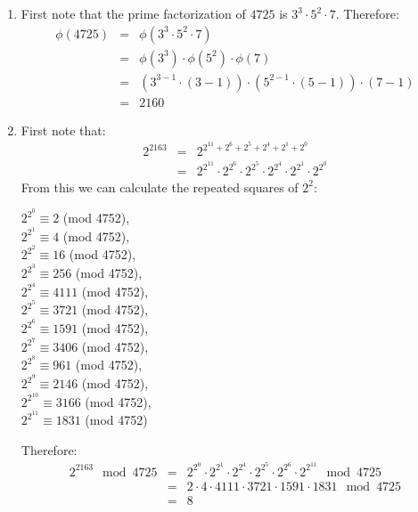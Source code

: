 \begin{enumerate}

    \item First note that the prime factorization of $4725$ is $3^{3} \cdot 5^{2} \cdot 7$.
    Therefore:
    \begin{eqnarray*}
        \phi(4725) &=& \phi(3^{3} \cdot 5^{2} \cdot 7) \\
        &=& \phi(3^{3}) \cdot \phi(5^{2}) \cdot \phi(7) \\
        &=& (3^{3-1} \cdot (3 - 1)) \cdot (5^{2-1} \cdot (5 - 1)) \cdot (7 - 1) \\
        &=& 2160
    \end{eqnarray*}

    \item First note that:
    \begin{eqnarray*}
        2^{2163} &=& 2^{2^{11} + 2^{6} + 2^{5} + 2^{4} + 2^{1} + 2^{0}} \\
        &=& 2^{2^{11}} \cdot 2^{2^{6}} \cdot 2^{2^{5}} \cdot 2^{2^{4}} \cdot 
        2^{2^{1}} \cdot 2^{2^{0}}
    \end{eqnarray*}
    From this we can calculate the repeated squares of $2^{2}$:
    \begin{center}
        $2^{2^{0}} \equiv 2$ (mod 4752), \\
        $2^{2^{1}} \equiv 4$ (mod 4752), \\
        $2^{2^{2}} \equiv 16$ (mod 4752), \\
        $2^{2^{3}} \equiv 256$ (mod 4752), \\
        $2^{2^{4}} \equiv 4111$ (mod 4752), \\
        $2^{2^{5}} \equiv 3721$ (mod 4752), \\
        $2^{2^{6}} \equiv 1591$ (mod 4752), \\
        $2^{2^{7}} \equiv 3406$ (mod 4752), \\
        $2^{2^{8}} \equiv 961$ (mod 4752), \\
        $2^{2^{9}} \equiv 2146$ (mod 4752), \\
        $2^{2^{10}} \equiv 3166$ (mod 4752), \\
        $2^{2^{11}} \equiv 1831$ (mod 4752)
    \end{center}
    Therefore:
    \begin{eqnarray*}
        2^{2163} \mod 4725 &=& 2^{2^{0}} \cdot 2^{2^{1}} \cdot 2^{2^{4}} \cdot 
        2^{2^{5}} \cdot 2^{2^{6}} \cdot 2^{2^{11}} \mod 4725 \\
        &=& 2 \cdot 4 \cdot 4111 \cdot 3721 \cdot 1591 \cdot 1831 \mod 4725 \\
        &=& 8
    \end{eqnarray*}


\end{enumerate}
